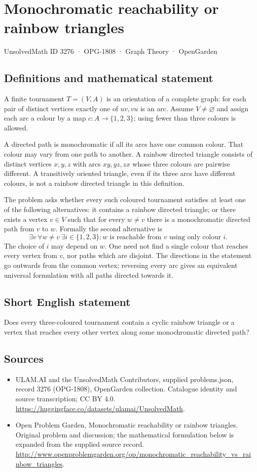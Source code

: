 \documentclass[11pt,a4paper]{article}
\begin{document}
\section*{Monochromatic reachability or rainbow triangles}\label{3276}
{\small UnsolvedMath ID 3276 · OPG-1808 · Graph Theory · OpenGarden}
\subsection{Definitions and mathematical statement}
A finite tournament $T=(V,A)$ is an orientation of a complete graph:
for each pair of distinct vertices exactly one of $uv,vu$ is an arc.
Assume $V\ne\varnothing$ and assign each arc a colour by a map
$c:A\to\{1,2,3\}$; using fewer than three colours is allowed.

A directed path is monochromatic if all its arcs have one common
colour. That colour may vary from one path to another. A rainbow
directed triangle consists of distinct vertices $x,y,z$ with arcs
$xy,yz,zx$ whose three colours are pairwise different. A transitively
oriented triangle, even if its three arcs have different colours,
is not a rainbow directed triangle in this definition.

The problem asks whether every such coloured tournament satisfies at
least one of the following alternatives: it contains a rainbow
directed triangle; or there exists a vertex $v\in V$ such that for
every $w\ne v$ there is a monochromatic directed path from $v$ to $w$.
Formally the second alternative is
\[
 \exists v\ \forall w\ne v\ \exists i\in\{1,2,3\}:
          w\text{ is reachable from }v\text{ using only colour }i.
\]
The choice of $i$ may depend on $w$. One need not find a single colour
that reaches every vertex from $v$, nor paths which are disjoint.
The directions in the statement go outwards from the common vertex;
reversing every arc gives an equivalent universal formulation with
all paths directed towards it.
\subsection{Short English statement}
Does every three-coloured tournament contain a cyclic rainbow triangle or a vertex that reaches every other vertex along some monochromatic directed path?
\subsection{Sources}
\begin{itemize}
\item[S1] ULAM.AI and the UnsolvedMath Contributors, supplied problems.json, record 3276 (OPG-1808), OpenGarden collection. Catalogue identity and source transcription; CC BY 4.0.
\url{https://huggingface.co/datasets/ulamai/UnsolvedMath}.
\item[S2] Open Problem Garden, Monochromatic reachability or rainbow triangles. Original problem and discussion; the mathematical formulation below is expanded from the supplied source record.
\url{http://www.openproblemgarden.org/op/monochromatic_reachability_vs_rainbow_triangles}.
\end{itemize}
\end{document}
